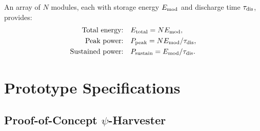 \documentclass[aps,prd,twocolumn,showpacs,preprintnumbers,superscriptaddress,nofootinbib]{revtex4-2}
\begin{document}
An array of $N$ modules, each with storage energy $E_{\rm mod}$ and
discharge time $\tau_{\rm dis}$, provides:
\begin{align}
\text{Total energy:}\quad & E_{\rm total} = NE_{\rm mod}, \\
\text{Peak power:}\quad & P_{\rm peak} = NE_{\rm mod}/\tau_{\rm dis}, \\
\text{Sustained power:}\quad & P_{\rm sustain} = E_{\rm mod}/\tau_{\rm dis}.
\end{align}

\section{Prototype Specifications}\label{sec:prototype}

\subsection{Proof-of-Concept $\psi$-Harvester}\label{sec:poc}
\end{document}
